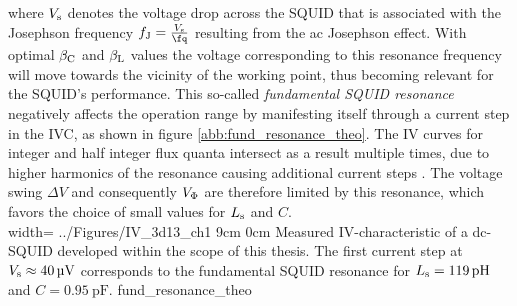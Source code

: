
where $V_{\rm s}$ denotes the voltage drop across the SQUID that is associated with the Josephson frequency $f_{\rm J}=\frac{V_{\rm s}}{\unit{\fq}}$ resulting from the ac Josephson effect. With optimal $\beta_{\rm C}$ and $\beta_{\rm L}$ values the voltage corresponding to this resonance frequency will move towards the vicinity of the working point, thus becoming relevant for the SQUID's performance.
This so-called \textit{fundamental SQUID resonance} negatively affects the operation range by manifesting itself through a current step in the IVC, as shown in figure \ref{abb:fund_resonance_theo}. The IV curves for integer and half integer flux quanta intersect as a result multiple times, due to higher harmonics of the resonance causing additional current steps \cite{Clarke2004}. The voltage swing $\Delta V$ and consequently $V_{\rm \Phi}$ are therefore limited by this resonance, which favors the choice of small values for $L_{\rm s}$ and $C$. \\

{width=\textwidth}
{../Figures/IV_3d13_ch1}
{9cm}
{0cm}
{Measured IV-characteristic of a dc-SQUID developed within the scope of this thesis. The first current step at $V_{\rm s}\approx \qty{40}{\uV}$ corresponds to the fundamental SQUID resonance for $L_{\rm s}=\qty{119}{\pH}$ and $C=\qty{0.95}{\pF}$.}
{fund_resonance_theo}


